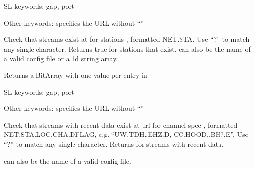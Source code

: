 \documentclass[letterpaper,11pt,english]{sphinxmanual}
\begin{document}
\begin{fulllineitems}
\label{\detokenize{src/Web/seedlink:has_sta}}
\end{fulllineitems}


\begin{DUlineblock}{0em}
\item[] SL keywords: gap, port
\item[] Other keywords:  specifies the URL without “”
\end{DUlineblock}

Check that streams exist at  for stations , formatted
NET.STA. Use “?” to match any single character. Returns true for
stations that exist.  can also be the name of a valid config
file or a 1d string array.

Returns a BitArray with one value per entry in 

\begin{fulllineitems}
\label{\detokenize{src/Web/seedlink:has_stream}}
\end{fulllineitems}


\begin{DUlineblock}{0em}
\item[] SL keywords: gap, port
\item[] Other keywords:  specifies the URL without “”
\end{DUlineblock}

Check that streams with recent data exist at url  for channel spec
, formatted NET.STA.LOC.CHA.DFLAG, e.g. “UW.TDH..EHZ.D,
CC.HOOD..BH?.E”. Use “?” to match any single character. Returns 
for streams with recent data.

 can also be the name of a valid config file.


\begin{fulllineitems}
\end{fulllineitems}
\end{document}
